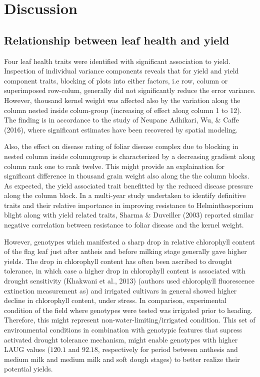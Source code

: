 \documentclass[12pt,oneside]{dukestatscithesis} %
\begin{document}
\hypertarget{discussion}{%
\chapter{Discussion}\label{discussion}}

\hypertarget{relationship-between-leaf-health-and-yield}{%
\section{Relationship between leaf health and yield}\label{relationship-between-leaf-health-and-yield}}

Four leaf health traits were identified with significant association to yield. Inspection of individual variance components reveals that for yield and yield component traits, blocking of plots into either factors, i.e row, column or superimposed row-colum, generally did not significantly reduce the error variance. However, thousand kernel weight was affected also by the variation along the column nested inside colum-group (increasing of effect along column 1 to 12). The finding is in accordance to the study of Neupane Adhikari, Wu, \& Caffe (2016), where significant estimates have been recovered by spatial modeling.

Also, the effect on disease rating of foliar disease complex due to blocking in nested column inside columngroup is characterized by a decreasing gradient along column rank one to rank twelve. This might provide an explaination for significant difference in thousand grain weight also along the the column blocks. As expected, the yield associated trait benefitted by the reduced disease pressure along the column block. In a multi-year study undertaken to identify definitive traits and their relative importance in improving resistance to Helminthosporium blight along with yield related traits, Sharma \& Duveiller (2003) reported similar negative correlation between resistance to foliar disease and the kernel weight.

However, genotypes which manifested a sharp drop in relative chlorophyll content of the flag leaf just after antheis and before milking stage generally gave higher yields. The drop in chlorophyll content has often been ascribed to drought tolerance, in which case a higher drop in chlorophyll content is associated with drought sensitivity (Khakwani et al., 2013) (authors used chlorophyll fluorescence extinction measurement as) and irrigated cultivars in general showed higher decline in chlorophyll content, under stress. In comparison, experimental condition of the field where genotypes were tested was irrigated prior to heading. Therefore, this might represent non-water-limiting/irrigated condition. This set of environmental conditions in combination with genotypic features that supress activated drought tolerance mechanism, might enable genotypes with higher LAUG values (\(120.1\) and \(92.18\), respectively for period between anthesis and medium milk and medium milk and soft dough stages) to better realize their potential yields.
\end{document}

